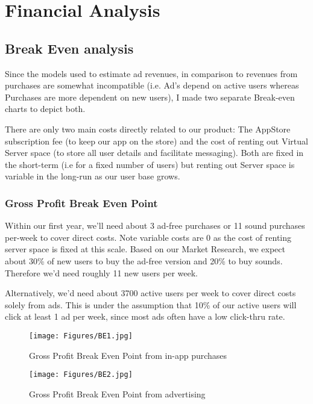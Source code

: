 \documentclass[12pt]{article}
\begin{document}
\section{Financial Analysis}

\subsection{Break Even analysis}
Since the models used to estimate ad revenues, in comparison to revenues from purchases are somewhat incompatible (i.e. Ad's depend on active users whereas Purchases are more dependent on new users), I made two separate Break-even charts to depict both.

There are only two main costs directly related to our product: The AppStore subscription fee (to keep our app on the store) and the cost of renting out Virtual Server space (to store all user details and facilitate messaging). Both are fixed in the short-term (i.e for a fixed number of users) but renting out Server space is variable in the long-run as our user base grows.

\subsubsection*{Gross Profit Break Even Point}
Within our first year, we'll need about 3 ad-free purchases or 11 sound purchases per-week to cover direct costs. Note variable costs are 0 as the cost of renting server space is fixed at this scale. Based on our Market Research, we expect about 30\% of new users to buy the ad-free version and 20\% to buy sounds. Therefore we'd need roughly 11 new users per week.

Alternatively, we'd need about 3700 active users per week to cover direct costs solely from ads. This is under the assumption that 10\% of our active users will click at least 1 ad per week, since most ads often have a low click-thru rate.

\begin{figure}[p]
    \centering
    \texttt{[image: Figures/BE1.jpg]}
    \caption{Gross Profit Break Even Point from in-app purchases}
    \label{fig:BE_GP_Purchases}
\end{figure}

\begin{figure}[p]
    \centering
    \texttt{[image: Figures/BE2.jpg]}
    \caption{Gross Profit Break Even Point from advertising}
    \label{fig:BE_GP_Ads}
\end{figure}
\end{document}
